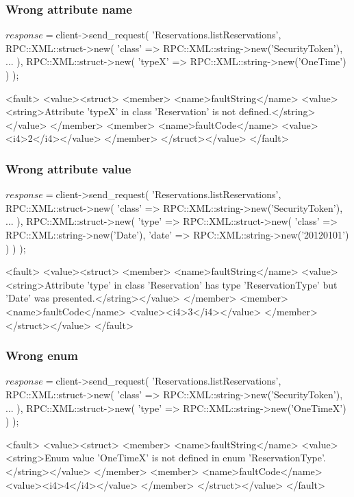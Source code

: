 \documentclass[a4paper]{report}
\begin{document}
\subsubsection{Wrong attribute name}
\begin{PerlCmd}
$response = $client->send_request(
    'Reservations.listReservations',
    RPC::XML::struct->new(
        'class' => RPC::XML::string->new('SecurityToken'),
        ...
    ),
    RPC::XML::struct->new(
        'typeX' => RPC::XML::string->new('OneTime')
    )
);
\end{PerlCmd}
\begin{PerlResponse}
<fault>
  <value><struct>
    <member>
      <name>faultString</name>
      <value><string>Attribute 'typeX' in class 'Reservation' is not defined.</string></value>
    </member>
    <member>
      <name>faultCode</name>
      <value><i4>2</i4></value>
    </member>
  </struct></value>
</fault>
\end{PerlResponse}

\subsubsection{Wrong attribute value}
\begin{PerlCmd}
$response = $client->send_request(
    'Reservations.listReservations',
    RPC::XML::struct->new(
        'class' => RPC::XML::string->new('SecurityToken'),
        ...
    ),
    RPC::XML::struct->new(
        'type' => RPC::XML::struct->new(
            'class' => RPC::XML::string->new('Date'),
            'date' => RPC::XML::string->new('20120101')
        )
    )
);
\end{PerlCmd}
\begin{PerlResponse}
<fault>
  <value><struct>
    <member>
      <name>faultString</name>
      <value><string>Attribute 'type' in class 'Reservation' has type
          'ReservationType' but 'Date' was presented.</string></value>
    </member>
    <member>
      <name>faultCode</name>
      <value><i4>3</i4></value>
    </member>
  </struct></value>
</fault>
\end{PerlResponse}

\subsubsection{Wrong enum}
\begin{PerlCmd}
$response = $client->send_request(
    'Reservations.listReservations',
    RPC::XML::struct->new(
        'class' => RPC::XML::string->new('SecurityToken'),
        ...
    ),
    RPC::XML::struct->new(
        'type' => RPC::XML::string->new('OneTimeX')
    )
);
\end{PerlCmd}
\begin{PerlResponse}
<fault>
  <value><struct>
    <member>
      <name>faultString</name>
      <value><string>Enum value 'OneTimeX' is not defined in enum
          'ReservationType'.</string></value>
    </member>
    <member>
      <name>faultCode</name>
      <value><i4>4</i4></value>
    </member>
  </struct></value>
</fault>
\end{PerlResponse}
\end{document}
